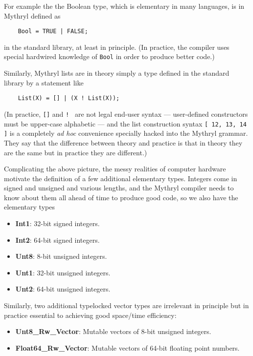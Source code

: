 For example the the Boolean type, which is elementary in many 
languages, is in Mythryl defined as
\begin{verbatim}
    Bool = TRUE | FALSE;
\end{verbatim}
in the standard library, at least in principle.  (In practice, 
the compiler uses special hardwired knowledge of {\tt Bool} in 
order to produce better code.)

Similarly, Mythryl lists are in theory simply a type defined 
in the standard library by a statement like
\begin{verbatim}
    List(X) = [] | (X ! List(X));
\end{verbatim}

(In practice, {\tt []} and {\tt ! } are not legal end-user 
syntax --- user-defined constructors must be upper-case 
alphabetic --- and the list construction syntax {\tt [ 12, 13, 14 ]} 
is a completely {\it ad hoc} convenience specially hacked into the Mythryl grammar. 
They say that the difference between theory and practice is that in theory 
they are the same but in practice they are different.)

Complicating the above picture, the messy realities of computer hardware motivate the 
definition of a few additional elementary types.  Integers come in 
signed and unsigned and various lengths, and the Mythryl compiler 
needs to know about them all ahead of time to produce good code, 
so we also have the elementary types 
\begin{itemize}
\item {\bf Int1}:  32-bit signed integers.
\item {\bf Int2}:  64-bit signed integers.
\item {\bf Unt8}:  8-bit unsigned integers.
\item {\bf Unt1}: 32-bit unsigned integers.
\item {\bf Unt2}: 64-bit unsigned integers.
\end{itemize}

Similarly, two additional typelocked vector types are irrelevant 
in principle but in practice essential to achieving good space/time 
efficiency:
\begin{itemize}
\item {\bf Unt8\_Rw\_Vector}:  Mutable vectors of 8-bit unsigned integers.
\item {\bf Float64\_Rw\_Vector}:  Mutable vectors of 64-bit floating point numbers.
\end{itemize}

